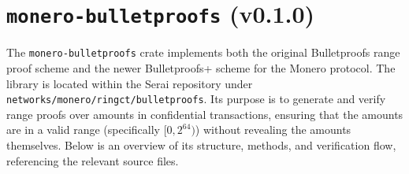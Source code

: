 \documentclass[12pt,a4paper]{article}
\begin{document}




\section{\texttt{monero-bulletproofs} (v0.1.0)}
\label{sec:monero-bulletproofs-impl}

The \texttt{monero-bulletproofs} crate implements both the original Bulletproofs range proof scheme and the newer Bulletproofs+ scheme for the Monero protocol.  The library is located within the Serai repository under \texttt{\small networks/monero/ringct/bulletproofs}.  Its purpose is to generate and verify range proofs over amounts in confidential transactions, ensuring that the amounts are in a valid range (specifically $[0, 2^{64})$) without revealing the amounts themselves.  Below is an overview of its structure, methods, and verification flow, referencing the relevant source files.
\end{document}

